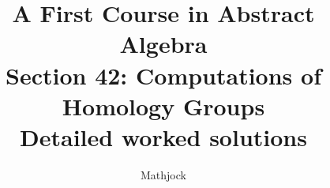 
\title{\textbf{A First Course in Abstract Algebra}\\[0.3em]Section 42: Computations of Homology Groups\\[0.3em]\large Detailed worked solutions}
\author{Mathjock}
\date{}

\maketitle
\bookinfo
\tableofcontents
\clearpage
\renewcommand{\thesection}{42}
\renewcommand{\theHsection}{fraleigh.42}


